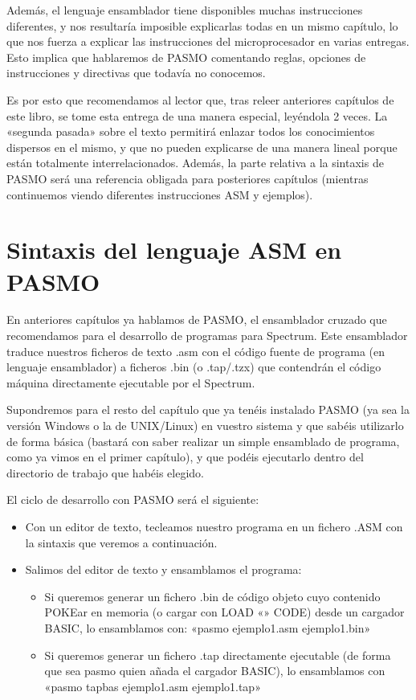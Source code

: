 \documentclass[letterpaper,10pt,spanish]{sphinxmanual}
\begin{document}
Además, el lenguaje ensamblador tiene disponibles muchas instrucciones diferentes, y nos resultaría imposible explicarlas todas en un mismo capítulo, lo que nos fuerza a explicar las instrucciones del microprocesador en varias entregas. Esto implica que hablaremos de PASMO comentando reglas, opciones de instrucciones y directivas que todavía no conocemos.

Es por esto que recomendamos al lector que, tras releer anteriores capítulos de este libro, se tome esta entrega de una manera especial, leyéndola 2 veces. La «segunda pasada» sobre el texto permitirá enlazar todos los conocimientos dispersos en el mismo, y que no pueden explicarse de una manera lineal porque están totalmente interrelacionados. Además, la parte relativa a la sintaxis de PASMO será una referencia obligada para posteriores capítulos (mientras continuemos viendo diferentes instrucciones ASM y ejemplos).


\section{Sintaxis del lenguaje ASM en PASMO}
\label{\detokenize{04_lenguaje_ensamblador_01/lenguaje_ensamblador_01:sintaxis-del-lenguaje-asm-en-pasmo}}
En anteriores capítulos ya hablamos de PASMO, el ensamblador cruzado que recomendamos para el desarrollo de programas para Spectrum. Este ensamblador traduce nuestros ficheros de texto .asm con el código fuente de programa (en lenguaje ensamblador) a ficheros .bin (o .tap/.tzx) que contendrán el código máquina directamente ejecutable por el Spectrum.

Supondremos para el resto del capítulo que ya tenéis instalado PASMO (ya sea la versión Windows o la de UNIX/Linux) en vuestro sistema y que sabéis utilizarlo de forma básica (bastará con saber realizar un simple ensamblado de programa, como ya vimos en el primer capítulo), y que podéis ejecutarlo dentro del directorio de trabajo que habéis elegido.

El ciclo de desarrollo con PASMO será el siguiente:
\begin{itemize}
\item {} 
Con un editor de texto, tecleamos nuestro programa en un fichero .ASM con la sintaxis que veremos a continuación.

\item {} 
Salimos del editor de texto y ensamblamos el programa:
\begin{itemize}
\item {} 
Si queremos generar un fichero .bin de código objeto cuyo contenido POKEar en memoria (o cargar con LOAD «» CODE) desde un cargador BASIC, lo ensamblamos con: «pasmo ejemplo1.asm ejemplo1.bin»

\item {} 
Si queremos generar un fichero .tap directamente ejecutable (de forma que sea pasmo quien añada el cargador BASIC), lo ensamblamos con «pasmo \textendash{}tapbas ejemplo1.asm ejemplo1.tap»

\end{itemize}

\end{itemize}
\end{document}
